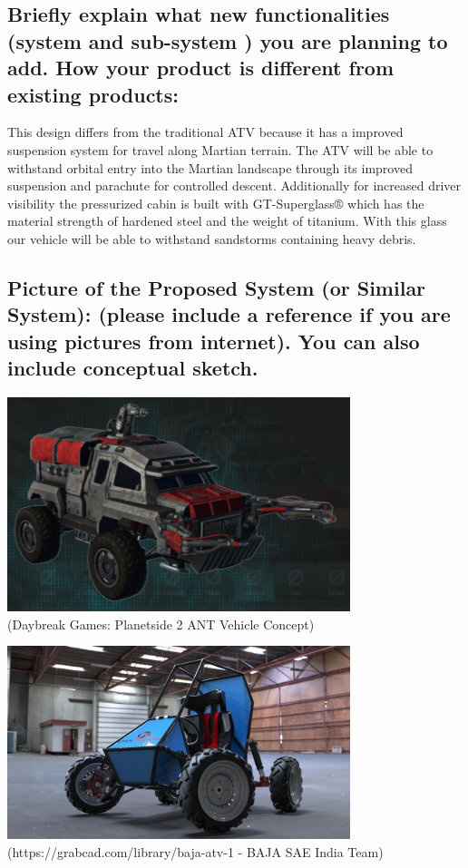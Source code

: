 \subsection{Briefly explain what new functionalities (system and sub-system ) you are planning to add. How your product is different from existing products:}

This design differs from the traditional ATV because it has a improved suspension system for travel along Martian terrain. The ATV will be able to withstand orbital entry into the Martian landscape through its improved suspension and parachute for controlled descent. Additionally for increased driver visibility the pressurized cabin is built with GT-Superglass® which has the material strength of hardened steel and the weight of titanium. With this glass our vehicle will be able to withstand sandstorms containing heavy debris.

\subsection{Picture of  the Proposed System (or Similar System): (please include a reference if you are using pictures from internet). You can also include conceptual sketch.}
\begin{center}
\includegraphics[width=0.75\textwidth]{a-1-1-ProjectIdeation/b-1-ProjectProposal/c-1-Images/Planetside.png} \\
(Daybreak Games: Planetside 2 ANT Vehicle Concept)

\includegraphics[width=0.75\textwidth]{a-1-1-ProjectIdeation/b-1-ProjectProposal/c-1-Images/BAJA.jpeg} \\
(https://grabcad.com/library/baja-atv-1 - BAJA SAE India Team)
\end{center}
